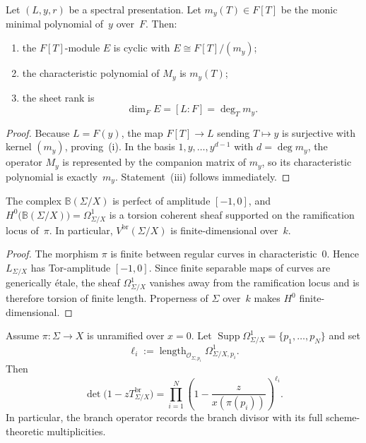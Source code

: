 \begin{proposition}
\label{prop:sheet-operator-minpoly}
Let $(L,y,r)$ be a spectral presentation.  Let $m_y(T)\in F[T]$ be the monic
minimal polynomial of~$y$ over~$F$.  Then:
\begin{enumerate}[label=\textup{(\roman*)}]
\item the $F[T]$-module $E$ is cyclic with
$E\cong F[T]/(m_y)$;
\item the characteristic polynomial of $M_y$ is $m_y(T)$;
\item the sheet rank is
\[
\dim_F E=[L:F]=\deg_T m_y.
\]
\end{enumerate}
\end{proposition}

\begin{proof}
Because $L=F(y)$, the map $F[T]\to L$ sending $T\mapsto y$ is surjective with
kernel $(m_y)$, proving~(i).  In the basis
$1,y,\dots,y^{d-1}$ with $d=\deg m_y$, the operator $M_y$ is represented by the
companion matrix of $m_y$, so its characteristic polynomial is exactly~$m_y$.
Statement~(iii) follows immediately.
\end{proof}

\begin{proposition}
\label{prop:branch-complex-support}
The complex $\mathbb B(\Sigma/X)$ is perfect of amplitude $[-1,0]$, and
$H^0\bigl(\mathbb B(\Sigma/X)\bigr)=\Omega^1_{\Sigma/X}$ is a torsion coherent
sheaf supported on the ramification locus of~$\pi$.  In particular,
$V^{\mathrm{br}}(\Sigma/X)$ is finite-dimensional over~$k$.
\end{proposition}

\begin{proof}
The morphism $\pi$ is finite between regular curves in characteristic~$0$.
Hence $L_{\Sigma/X}$ has Tor-amplitude $[-1,0]$.  Since finite separable maps of
curves are generically étale, the sheaf $\Omega^1_{\Sigma/X}$ vanishes away from
the ramification locus and is therefore torsion of finite length.  Properness of
$\Sigma$ over~$k$ makes $H^0$ finite-dimensional.
\end{proof}

\begin{theorem}
\label{thm:determinantal-branch-formula-general}
Assume $\pi\colon \Sigma\to X$ is unramified over $x=0$.  Let
$\operatorname{Supp}\Omega^1_{\Sigma/X}=\{p_1,\dots,p_N\}$ and set
\[
\ell_i:=\operatorname{length}_{\mathcal O_{\Sigma,p_i}}
\Omega^1_{\Sigma/X,p_i}.
\]
Then
\[
\det\bigl(1-zT^{\mathrm{br}}_{\Sigma/X}\bigr)
=
\prod_{i=1}^{N}\left(1-\frac{z}{x(\pi(p_i))}\right)^{\ell_i}.
\]
In particular, the branch operator records the branch divisor with its full
scheme-theoretic multiplicities.
\end{theorem}


